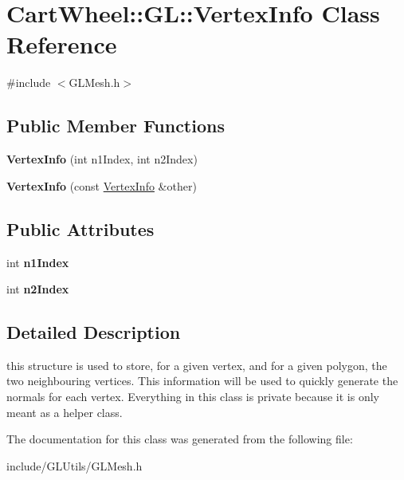 \hypertarget{classCartWheel_1_1GL_1_1VertexInfo}{
\section{CartWheel::GL::VertexInfo Class Reference}
\label{classCartWheel_1_1GL_1_1VertexInfo}
}


{\ttfamily \#include $<$GLMesh.h$>$}

\subsection*{Public Member Functions}
\begin{DoxyCompactItemize}
\item 
\hypertarget{classCartWheel_1_1GL_1_1VertexInfo_a9fbafe3e916c475289c9c6c8e9941c4b}{
{\bfseries VertexInfo} (int n1Index, int n2Index)}
\label{classCartWheel_1_1GL_1_1VertexInfo_a9fbafe3e916c475289c9c6c8e9941c4b}

\item 
\hypertarget{classCartWheel_1_1GL_1_1VertexInfo_a1b2660b3f62cc062d3092b1ccad4e29d}{
{\bfseries VertexInfo} (const \hyperlink{classCartWheel_1_1GL_1_1VertexInfo}{VertexInfo} \&other)}
\label{classCartWheel_1_1GL_1_1VertexInfo_a1b2660b3f62cc062d3092b1ccad4e29d}

\end{DoxyCompactItemize}
\subsection*{Public Attributes}
\begin{DoxyCompactItemize}
\item 
\hypertarget{classCartWheel_1_1GL_1_1VertexInfo_a6f78d1c9d5c166cfcb575b7b26320bd0}{
int {\bfseries n1Index}}
\label{classCartWheel_1_1GL_1_1VertexInfo_a6f78d1c9d5c166cfcb575b7b26320bd0}

\item 
\hypertarget{classCartWheel_1_1GL_1_1VertexInfo_a24263a7e152da2210556c59f7393ce00}{
int {\bfseries n2Index}}
\label{classCartWheel_1_1GL_1_1VertexInfo_a24263a7e152da2210556c59f7393ce00}

\end{DoxyCompactItemize}


\subsection{Detailed Description}
this structure is used to store, for a given vertex, and for a given polygon, the two neighbouring vertices. This information will be used to quickly generate the normals for each vertex. Everything in this class is private because it is only meant as a helper class. 

The documentation for this class was generated from the following file:\begin{DoxyCompactItemize}
\item 
include/GLUtils/GLMesh.h\end{DoxyCompactItemize}
